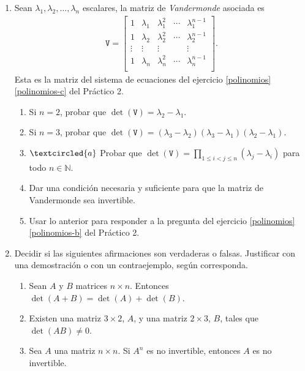 \begin{enumerate}[topsep=6pt,itemsep=.4cm]
\item\label{vandermonde} Sean $\lambda_1, \lambda_2, \dots, \lambda_n$ escalares, la matriz de \emph{Vandermonde} asociada es
\begin{align*}
\mathtt V = \begin{bmatrix}
1 & \lambda_1 & \lambda_1^2 & \cdots & \lambda_1^{n-1}\\
1 & \lambda_2 & \lambda_2^2 & \cdots & \lambda_2^{n-1}\\
\vdots &\vdots &\vdots & &\vdots\\
1 & \lambda_n & \lambda_n^2 & \cdots & \lambda_n^{n-1}\\
\end{bmatrix}.
\end{align*}
Esta es la matriz del sistema de ecuaciones del ejercicio \ref{polinomios}\,\ref{polinomios-c} del Práctico 2.


\begin{enumerate}
	\item Si $n=2$, probar que $\det(\mathtt V) = \lambda_2-\lambda_1$.
	\item Si $n=3$, probar que $\det(\mathtt V) = (\lambda_3-\lambda_2) (\lambda_3-\lambda_1) (\lambda_2-\lambda_1)$.
	\item\label{vandermonde gral} $\textcircled{a}$ Probar que $\det(\mathtt V) = \prod_{1\leq i< j \leq n}(\lambda_j-\lambda_i)$ para todo $n\in\mathbb{N}$.
	\item Dar una condición necesaria y suficiente para que la matriz de Vandermonde sea invertible.
	\item Usar lo anterior para responder a la pregunta del ejercicio \ref{polinomios}\,\ref{polinomios-b} del Práctico 2.
	\end{enumerate}
	\item Decidir si las siguientes afirmaciones son verdaderas o falsas. Justificar con una demostración o con un contraejemplo, según corresponda.
	\begin{enumerate}
	\item Sean $A$ y $B$ matrices $n \times n$. Entonces $\det(A + B) = \det (A) + \det(B)$.
	\item Existen una matriz $3\times 2$, $A$, y una matriz $2\times 3$, $B$, tales que $\det(AB) \neq 0$.
	\item Sea $A$ una matriz $n\times n$. Si $A^n$ es no invertible, entonces $A$ es no invertible.
\end{enumerate}

\end{enumerate}



